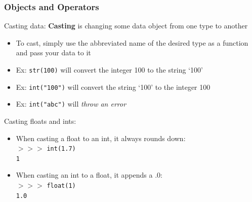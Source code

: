\documentclass{beamer}
\newcommand{\code}[1]{\texttt{#1}}
\newcommand{\shp}{$>>>$ }
\begin{document}
\begin{frame}%
	\frametitle{Objects and Operators}
	
	\begin{alertblock}{Casting data:}
			\textbf{Casting} is changing some data object from one type to another
			\begin{itemize}
				\item To cast, simply use the abbreviated name of the desired type as a function and pass your data to it
				\item Ex: \code{str(100)} will convert the integer 100 to the string `100'
				\item Ex: \code{int("100")} will convert the string `100' to the integer 100
				\item Ex: \code{int("abc")} will \emph{throw an error}
			\end{itemize}
			
			
			Casting floats and ints:
			\begin{itemize}
				\item When casting a float to an int, it always rounds down: \\
						\shp \code{int(1.7) \\ 1}
				\item When casting an int to a float, it appends a .0: \\
						\shp \code{float(1) \\ 1.0}
			\end{itemize}
	\end{alertblock}
	
\end{frame}
\end{document}
